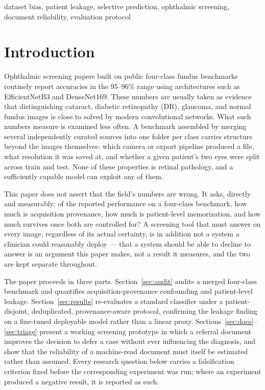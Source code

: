 \documentclass[conference]{IEEEtran}
\begin{document}
\begin{IEEEkeywords}
dataset bias, patient leakage, selective prediction, ophthalmic screening,
document reliability, evaluation protocol
\end{IEEEkeywords}

\section{Introduction}

Ophthalmic screening papers built on public four-class fundus benchmarks
routinely report accuracies in the 95--96\% range using architectures such
as EfficientNetB3 and DenseNet169. These numbers are usually taken as
evidence that distinguishing cataract, diabetic retinopathy (DR), glaucoma,
and normal fundus images is close to solved by modern convolutional
networks. What such numbers measure is examined less often. A benchmark
assembled by merging several independently curated sources into one folder
per class carries structure beyond the images themselves: which camera or
export pipeline produced a file, what resolution it was saved at, and
whether a given patient's two eyes were split across train and test. None of
these properties is retinal pathology, and a sufficiently capable model can
exploit any of them.

This paper does not assert that the field's numbers are wrong. It asks,
directly and measurably: of the reported performance on a four-class
benchmark, how much is acquisition provenance, how much is patient-level
memorization, and how much survives once both are controlled for? A
screening tool that must answer on every image, regardless of its actual
certainty, is in addition not a system a clinician could reasonably deploy
--- that a system should be able to decline to answer is an argument this
paper makes, not a result it measures, and the two are kept separate
throughout.

The paper proceeds in three parts. Section~\ref{sec:audit} audits a merged
four-class benchmark and quantifies acquisition-provenance confounding and
patient-level leakage. Section~\ref{sec:results} re-evaluates a standard
classifier under a patient-disjoint, deduplicated, provenance-aware
protocol, confirming the leakage finding on a fine-tuned deployable model
rather than a linear proxy. Sections~\ref{sec:docs}--\ref{sec:triage}
present a working screening prototype in which a referral document improves
the decision to defer a case without ever influencing the diagnosis, and
show that the reliability of a machine-read document must itself be
estimated rather than assumed. Every research question below carries a
falsification criterion fixed before the corresponding experiment was run;
where an experiment produced a negative result, it is reported as such.
\end{document}
